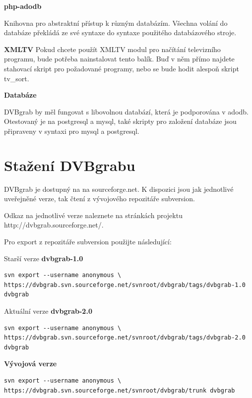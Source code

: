\vspace{10pt}

\textbf{php-adodb}

Knihovna pro abstraktní přístup k různým databázím. Všechna volání do databáze překládá ze své syntaxe do syntaxe použitého databázového stroje.

\vspace{10pt}

\textbf{XMLTV}
Pokud chcete použít XMLTV modul pro načítání televizního programu, bude potřeba nainstalovat tento balík. Buď v něm přímo najdete stahovací skript pro požadované programy, nebo se bude hodit alespoň skript tv\_sort.

\vspace{10pt}

\textbf{Databáze}

DVBgrab by měl fungovat s libovolnou databází, která je podporována v adodb. Otestovaný je na postgresql a mysql, také skripty pro založení databáze jsou připraveny v syntaxi pro mysql a postgresql.

\vspace{10pt}

\section{Stažení DVBgrabu}

\vspace{10pt}

DVBgrab je dostupný na na sourceforge.net. K dispozici jsou jak jednotlivé uveřejněné verze, tak čtení z vývojového repozitáře subversion.

Odkaz na jednotlivé verze naleznete na stránkách projektu http://dvbgrab.sourceforge.net/.

Pro export z repozitáře subversion použijte následující:

\vspace{10pt}

Starší verze \textbf{dvbgrab-1.0}
\begin{small}\begin{verbatim}
svn export --username anonymous \
https://dvbgrab.svn.sourceforge.net/svnroot/dvbgrab/tags/dvbgrab-1.0 dvbgrab
\end{verbatim}\end{small}
Aktuální verze \textbf{dvbgrab-2.0}
\begin{small}\begin{verbatim}
svn export --username anonymous \
https://dvbgrab.svn.sourceforge.net/svnroot/dvbgrab/tags/dvbgrab-2.0 dvbgrab
\end{verbatim}\end{small}
\textbf{Vývojová verze}
\begin{small}\begin{verbatim}
svn export --username anonymous \
https://dvbgrab.svn.sourceforge.net/svnroot/dvbgrab/trunk dvbgrab
\end{verbatim}\end{small}

